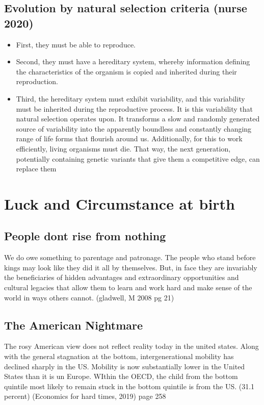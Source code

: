 \documentclass[11pt]{article}
\begin{document}
\subsection{Evolution by natural selection criteria (nurse 2020)}
\begin{itemize}
 \item {
       First, they must be able to reproduce.
       }
 \item {
       Second, they must have a hereditary system, whereby information defining the
       characteristics of the organism is copied and inherited during their reproduction.
       }
       \item{
                   Third, the hereditary system must exhibit variability, and this variability must be
                   inherited during the reproductive process. It is this variability that natural selection
                   operates upon. It transforms a slow and randomly generated source of variability into the
                   apparently boundless and constantly changing range of life forms that flourish around us.
                   Additionally, for this to work efficiently, living organisms must die. That way, the next
                   generation, potentially containing genetic variants that give them a competitive edge, can
                   replace them
                   
                   
             }
\end{itemize}

\section{Luck and Circumstance at birth}
\subsection{People dont rise from nothing}
We do owe something to parentage and patronage. The people who stand before kings may look like they did it all by themselves. But, in face they are invariably the beneficiaries of hidden advantages and extraordinary opportunities and cultural legacies that allow them to learn and work hard and make sense of the world in ways others cannot. (gladwell, M 2008 pg 21)
\subsection{The American Nightmare}
The rosy American view does not reflect reality today in the united states. Along with the general stagnation at the bottom, intergenerational mobility has declined sharply in the US. Mobility is now substantially lower in the United States than it is un Europe. WIthin the OECD, the child from the bottom quintile most likely to remain stuck in the bottom quintile is from the US. (31.1 percent) (Economics for hard times, 2019) page 258
\end{document}
